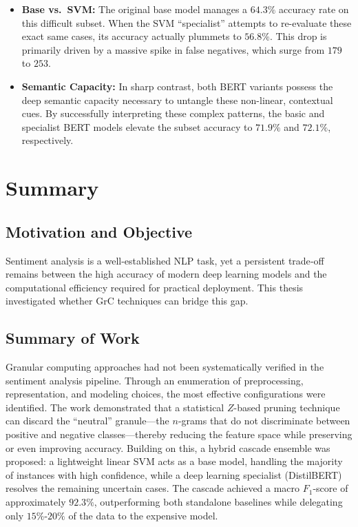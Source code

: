\documentclass[a4paper,fleqn]{cas-dc}
\newcommand{\zscore}{Z}
\begin{document}
\begin{itemize}
	\item \textbf{Base vs.\ SVM:} The original base model manages a $64.3\%$ accuracy rate on this difficult subset. When the SVM ``specialist'' attempts to re-evaluate these exact same cases, its accuracy actually plummets to $56.8\%$. This drop is primarily driven by a massive spike in false negatives, which surge from $179$ to $253$.
	
	\item \textbf{Semantic Capacity:} In sharp contrast, both BERT variants possess the deep semantic capacity necessary to untangle these non-linear, contextual cues. By successfully interpreting these complex patterns, the basic and specialist BERT models elevate the subset accuracy to $71.9\%$ and $72.1\%$, respectively.
\end{itemize}




\section{Summary} \label{chap:summary}

\subsection{Motivation and Objective}

Sentiment analysis is a well-established NLP task, yet a persistent trade‑off remains between the high accuracy of modern deep learning models and the computational efficiency required for practical deployment. This thesis investigated whether GrC techniques can bridge this gap.

\subsection{Summary of Work}

Granular computing approaches had not been systematically verified in the sentiment analysis pipeline. Through an enumeration of preprocessing, representation, and modeling choices, the most effective configurations were identified. The work demonstrated that a statistical $\zscore$-based pruning technique can discard the ``neutral'' granule---the $n$-grams that do not discriminate between positive and negative classes---thereby reducing the feature space while preserving or even improving accuracy. Building on this, a hybrid cascade ensemble was proposed: a lightweight linear SVM acts as a base model, handling the majority of instances with high confidence, while a deep learning specialist (DistilBERT) resolves the remaining uncertain cases. The cascade achieved a macro $F_1$-score of approximately $92.3\%$, outperforming both standalone baselines while delegating only $15\%$-$20\%$ of the data to the expensive model.
\end{document}
